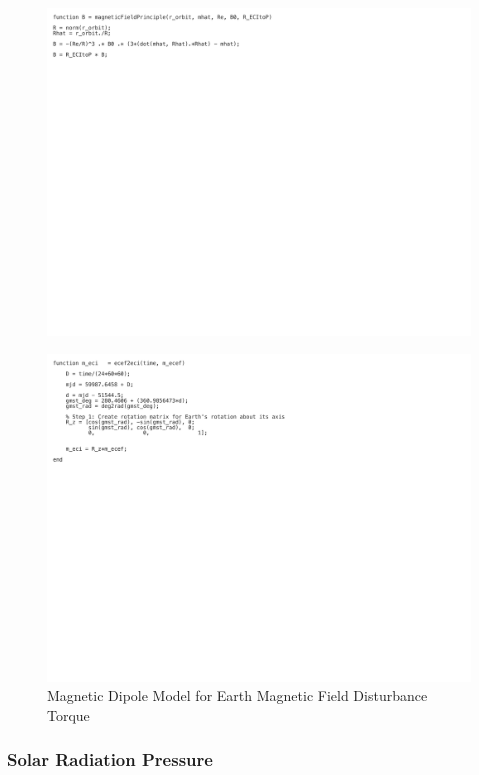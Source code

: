 \begin{figure}[H]
    \centering
    \includegraphics[trim={0cm 15cm 10cm 0cm},clip,width = 15cm]{Images/PS5/magneticField-5.png}
\end{figure}

\begin{figure}[H]
    \centering
    \captionsetup{justification = centering}
    \includegraphics[trim={0cm 15cm 10cm 0cm},clip,width = 15cm]{Images/PS5/magneticField-6.png}
    \caption{Magnetic Dipole Model for Earth Magnetic Field Disturbance Torque}
    \label{fig:simulink_mag}
\end{figure}

\subsubsection{Solar Radiation Pressure}

